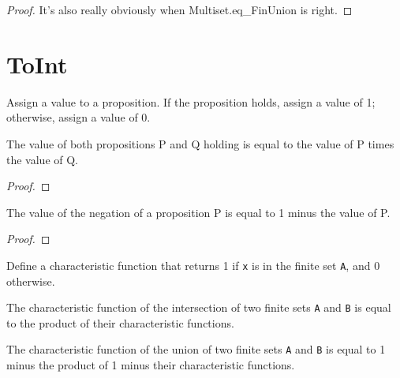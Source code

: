 \begin{proof}
    \leanok
    It's also really obviously when Multiset.eq_FinUnion is right.
\end{proof}
\section{ToInt}

\begin{definition}\label{toInt}
  \leanok
  Assign a value to a proposition. If the proposition holds, assign a value of 1; otherwise, assign a value of 0.
\end{definition}

\begin{lemma}\label{toInt_and}
  \leanok
  The value of both propositions P and Q holding is equal to the value of P times the value of Q.
\end{lemma}

\begin{proof}
  \leanok
\end{proof}

\begin{lemma}\label{toInt_not}
  \leanok
  The value of the negation of a proposition P is equal to 1 minus the value of P.
\end{lemma}

\begin{proof}
  \leanok
\end{proof}

\begin{definition}\label{char_fun}
  \leanok
  Define a characteristic function that returns 1 if \verb|x| is in the finite set \verb|A|, and 0 otherwise.
\end{definition}

\begin{lemma}\label{char_fun_inter}
  The characteristic function of the intersection of two finite sets \verb|A| and \verb|B| is equal to the product of their characteristic functions.
\end{lemma}

\begin{lemma}\label{char_fun_union}
  The characteristic function of the union of two finite sets \verb|A| and \verb|B| is equal to 1 minus the product of 1 minus their characteristic functions.
\end{lemma}


